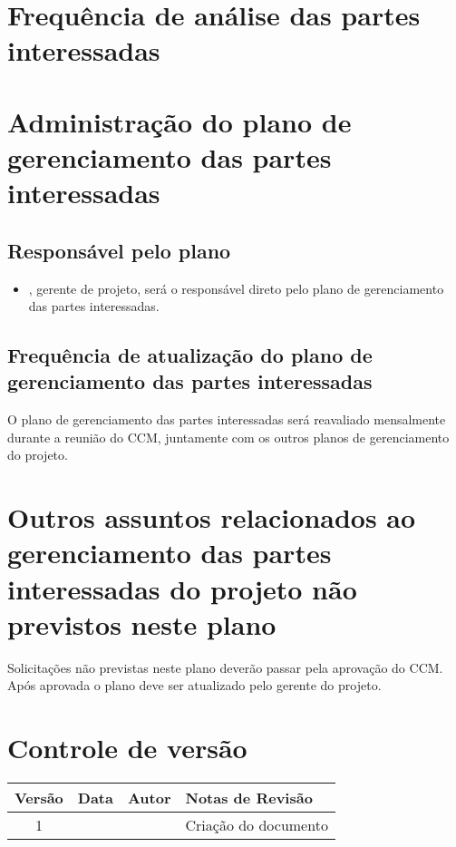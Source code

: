 \section{Frequência de análise das partes interessadas}


\section{Administração do plano de gerenciamento das partes interessadas}

\subsection{Responsável pelo plano}

\begin{itemize}
	\item \projectManagerName{}, gerente de projeto, será o responsável direto pelo plano de gerenciamento das partes interessadas.
\end{itemize}

\subsection{Frequência de atualização do plano de gerenciamento das partes interessadas}

O plano de gerenciamento das partes interessadas será reavaliado mensalmente durante a reunião do CCM, juntamente com os outros planos de gerenciamento do projeto.

\section{Outros assuntos relacionados ao gerenciamento das partes interessadas do projeto não previstos neste plano}

Solicitações não previstas neste plano deverão passar pela aprovação do CCM. Após aprovada o plano deve ser atualizado pelo gerente do projeto.

\section{Controle de versão}

\begin{table}[H]
	\begin{tabularx}{\textwidth}{| c | c | X | X |}
		\hline
		\textbf{Versão} & \textbf{Data} & \textbf{Autor}        & \textbf{Notas de Revisão} \\
		\hline
		1                &               & \projectManagerName{} & Criação do documento     \\
		\hline
	\end{tabularx}
	\centering
\end{table}

